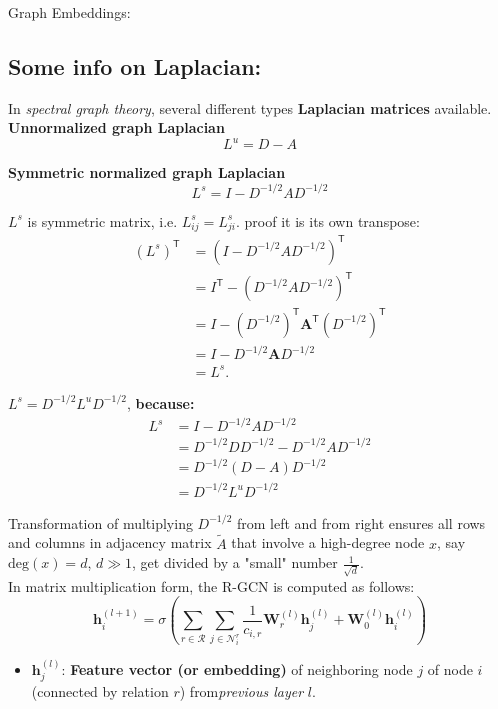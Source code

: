 \documentclass[twocolumn]{article}
\begin{document}
\begin{literaturepaper}{Graph Embeddings:}
\subsection*{Some info on Laplacian:}

In \textit{spectral graph theory}, several different types \textbf{Laplacian matrices} available.\\

\textbf{Unnormalized graph Laplacian}
$$
L^u = D - A
$$

\textbf{Symmetric normalized graph Laplacian}
$$
L^s = I - D^{-1/2}AD^{-1/2}
$$

$L^s$ is symmetric matrix, i.e. $L^s_{ij} = L^s_{ji}$. proof it is its own transpose:
\begin{align*}
(L^s)^{\mathsf{T}} &= \left(I - D^{-1/2}AD^{-1/2}\right)^{\mathsf{T}} \\
&= I^{\mathsf{T}} - \left(D^{-1/2}AD^{-1/2}\right)^{\mathsf{T}} \\
&= I - \left(D^{-1/2}\right)^{\mathsf{T}} \mathbf{A}^{\mathsf{T}} \left(D^{-1/2}\right)^{\mathsf{T}} \\
&= I - D^{-1/2} \mathbf{A} D^{-1/2} \\
&= L^s.
\end{align*}

$L^s = D^{-1/2} L^u D^{-1/2}$, \textbf{because:}
\begin{align*}
L^s &= I - D^{-1/2}AD^{-1/2} \\
    &= D^{-1/2} DD^{-1/2} - D^{-1/2} AD^{-1/2} \\
    &= D^{-1/2} (D - A) D^{-1/2} \\
    &= D^{-1/2} L^u D^{-1/2}
\end{align*}

Transformation of multiplying $D^{-1/2}$ from left and from right ensures all rows and columns in adjacency matrix $\tilde{A}$ that involve a high-degree node $x$, say $\text{deg}(x) = d$, $d \gg 1$, get divided by a "small" number $\frac{1}{\sqrt{d}}$.\\

In matrix multiplication form, the R-GCN is computed as follows:
$$
\mathbf{h}_i^{(l+1)} = \sigma \left( \sum_{r \in \mathcal{R}} \sum_{j \in \mathcal{N}_i^r} \frac{1}{c_{i,r}} \mathbf{W}_r^{(l)} \mathbf{h}_j^{(l)} + \mathbf{W}_0^{(l)} \mathbf{h}_i^{(l)} \right)
$$

\begin{itemize}[leftmargin=*,noitemsep,topsep=0pt] %
    \item $\mathbf{h}_j^{(l)}$: \textbf{Feature vector (or embedding)} of neighboring node $j$ of node $i$ (connected by relation $r$) from\textit{previous layer} $l$.


\end{itemize}
\end{literaturepaper}
\end{document}
